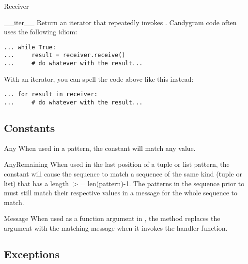 \documentclass{howto}
\newcommand{\greaterthan}[0]{\begin{math}>\end{math}}
\newcommand{\greaterthan}[0]{>}
\begin{document}
\begin{classdesc}{Receiver}{}
\begin{methoddesc}{__iter__}{}
Return an iterator that repeatedly invokes . Candygram code
often uses the following idiom:
\begin{verbatim}
... while True:
...     result = receiver.receive()
...     # do whatever with the result...
\end{verbatim}
With an iterator, you can spell the code above like this instead:
\begin{verbatim}
... for result in receiver:
...     # do whatever with the result...
\end{verbatim}
\end{methoddesc}

\end{classdesc}



\subsection{Constants}

\begin{datadesc}{Any}
When used in a pattern, the  constant will match any value.
\end{datadesc}

\begin{datadesc}{AnyRemaining}
When used in the last position of a tuple or list pattern, the
 constant will cause the sequence to match a sequence of
the same kind (tuple or list) that has a length \greaterthan= len(pattern)-1.
The patterns in the sequence prior to  must still match
their respective values in a message for the whole sequence to match.
\end{datadesc}

\begin{datadesc}{Message}
When used as a function argument in , the
 method replaces the argument with the matching
message when it invokes the handler function.
\end{datadesc}



\subsection{Exceptions}
\end{document}
